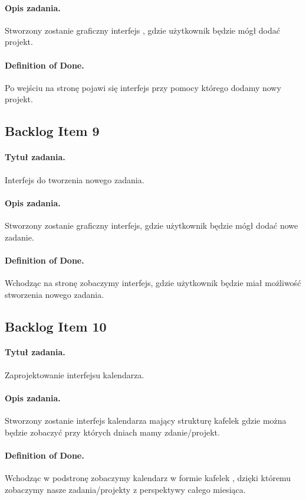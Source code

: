 ﻿\documentclass[a4paper]{article}
\begin{document}
\paragraph{Opis zadania.} Stworzony zostanie graficzny interfejs , gdzie użytkownik będzie mógł dodać projekt.
\paragraph{Definition of Done.} Po wejściu na stronę pojawi się interfejs przy pomocy którego dodamy nowy projekt.

\subsection{Backlog Item 9} 
\paragraph{Tytuł zadania.} Interfejs do tworzenia nowego zadania.
\paragraph{Opis zadania.} Stworzony zostanie graficzny interfejs, gdzie użytkownik będzie mógł dodać nowe zadanie.
\paragraph{Definition of Done.} Wchodząc na stronę zobaczymy interfejs, gdzie użytkownik będzie miał możliwość stworzenia nowego zadania.

\subsection{Backlog Item 10} 
\paragraph{Tytuł zadania.} Zaprojektowanie interfejsu kalendarza.
\paragraph{Opis zadania.} Stworzony zostanie interfejs kalendarza mający strukturę kafelek gdzie można będzie zobaczyć przy których dniach mamy zdanie/projekt.
\paragraph{Definition of Done.} Wchodząc w podstronę zobaczymy kalendarz w formie kafelek , dzięki któremu zobaczymy nasze zadania/projekty z perspektywy całego miesiąca.
\end{document}
